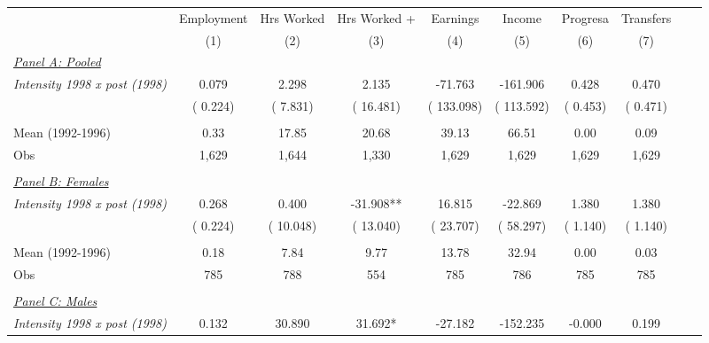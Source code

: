 \begin{tabular}{lccccccccc} \hline \hline
& \multicolumn{1}{c}{Employment} & \multicolumn{1}{c}{Hrs Worked} & \multicolumn{1}{c}{Hrs Worked +} & \multicolumn{1}{c}{Earnings} & \multicolumn{1}{c}{Income} & \multicolumn{1}{c}{Progresa} & \multicolumn{1}{c}{Transfers}   \\ 
\cmidrule(lr){2-2}\cmidrule(lr){3-3}\cmidrule(lr){4-4} \cmidrule(lr){5-5}\cmidrule(lr){6-6}\cmidrule(lr){7-7}\cmidrule(lr){8-8}
& (1) & (2) & (3) & (4) & (5) & (6) & (7)  \\  \toprule
\underline{\textit{Panel A: Pooled}}  \\  
\textit{Intensity 1998 x post (1998)} &        0.079  &        2.298 &        2.135 &      -71.763 &     -161.906 &        0.428 &        0.470\\  
& (       0.224)  & (       7.831) & (      16.481) & (     133.098) & (     113.592)  & (       0.453) & (       0.471)\\ 
  & & &  & & & &  \\ 
Mean (1992-1996) &         0.33  &        17.85 &        20.68 &        39.13 &        66.51 &         0.00&         0.09  \\  
Obs &        1,629  &        1,644 &        1,330 &        1,629 &        1,629 &        1,629 &        1,629 \\ 
  & & &  & & & &  \\ 
\underline{\textit{Panel B: Females}}  \\  
\textit{Intensity 1998 x post (1998)} &        0.268  &        0.400 &      -31.908** &       16.815 &      -22.869 &        1.380 &        1.380\\  
& (       0.224)  & (      10.048) & (      13.040) & (      23.707) & (      58.297)  & (       1.140) & (       1.140)\\ 
  & & &  & & & &  \\ 
Mean (1992-1996) &         0.18  &         7.84 &         9.77 &        13.78 &        32.94 &         0.00&         0.03  \\  
Obs &          785  &          788 &          554 &          785 &          786 &          785 &          785 \\ 
  & & &  & & & &  \\ 
\underline{\textit{Panel C: Males}}  \\  
\textit{Intensity 1998 x post (1998)} &        0.132  &       30.890 &       31.692* &      -27.182 &     -152.235 &       -0.000 &        0.199\\  

\end{tabular}
